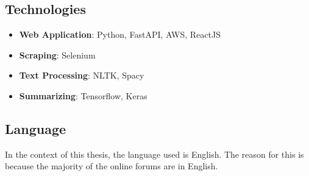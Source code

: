 \subsection*{Technologies}
\begin{itemize}
    \item \textbf{Web Application}: Python, FastAPI, AWS, ReactJS
    \item \textbf{Scraping}: Selenium
    \item \textbf{Text Processing}: NLTK, Spacy
    \item \textbf{Summarizing}: Tensorflow, Keras
\end{itemize}

\subsection*{Language}
In the context of this thesis, the language used is English. The reason for this is because the majority of the online forums are in English.

